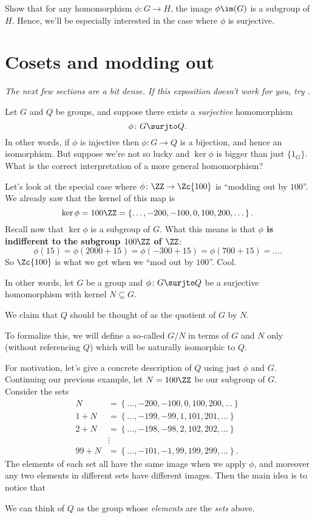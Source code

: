 \begin{ques}
	Show that for any homomorphism $\phi: G \to H$,
	the image $\phi\im(G)$ is a subgroup of $H$.
	Hence, we'll be especially interested in the case where $\phi$ is surjective.
\end{ques}

\section{Cosets and modding out}
\emph{The next few sections are a bit dense.
If this exposition doesn't work for you, try \cite{ref:gowers}.}

Let $G$ and $Q$ be groups, and suppose there exists
a \emph{surjective} homomorphism \[ \phi \colon G \surjto Q. \]
In other words, if $\phi$ is injective then $\phi \colon G \to Q$ is a bijection,
and hence an isomorphism.
But suppose we're not so lucky and $\ker\phi$ is bigger than just $\{1_G\}$.
What is the correct interpretation of a more general homomorphism?

Let's look at the special case where $\phi \colon \ZZ \to \Zc{100}$ is ``modding out by $100$''.
We already saw that the kernel of this map is
\[
	\ker \phi = 100\ZZ = \left\{ \dots, -200, -100, 0, 100, 200, \dots  \right\}.
\]
Recall now that $\ker \phi$ is a subgroup of $G$.
What this means is that \textbf{$\phi$ is indifferent to the subgroup $100\ZZ$ of $\ZZ$}:
\[ \phi(15) = \phi(2000 + 15) = \phi(-300 + 15) = \phi(700 + 15) = \dots. \]
So $\Zc{100}$ is what we get when we ``mod out by $100$''. Cool.

In other words, let $G$ be a group and $\phi \colon G \surjto Q$
be a surjective homomorphism with kernel $N \subseteq G$.
\begin{moral}
	We claim that $Q$ should be thought of as the quotient of $G$ by $N$.
\end{moral}
To formalize this, we will define a so-called
 $G/N$
in terms of $G$ and $N$ only (without referencing $Q$)
which will be naturally isomorphic to $Q$.

For motivation, let's give a concrete description of $Q$ using just $\phi$ and $G$.
Continuing our previous example, let $N = 100\ZZ$ be our subgroup of $G$.
Consider the sets
\begin{align*}
	N &= \left\{ \dots, -200, -100, 0, 100, 200, \dots \right\} \\
	1+N &= \left\{ \dots, -199, -99, 1, 101, 201, \dots \right\} \\
	2+N &= \left\{ \dots, -198, -98, 2, 102, 202, \dots \right\} \\
	&\vdots \\
	99+N &= \left\{ \dots, -101, -1, 99, 199, 299, \dots \right\}.
\end{align*}
The elements of each set all have the same image when we apply $\phi$,
and moreover any two elements in different sets have different images.
Then the main idea is to notice that
\begin{moral}
	We can think of $Q$ as the group
	whose \emph{elements} are the \emph{sets} above.
\end{moral}


